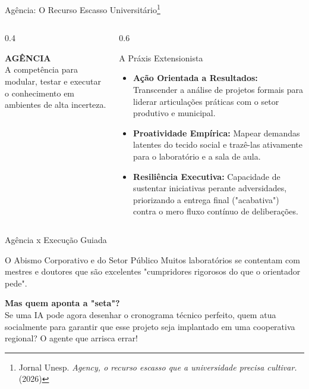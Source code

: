 \documentclass[aspectratio=169,12pt]{beamer}
\begin{document}
\begin{frame}{Agência: O Recurso Escasso Universitário\footnote{Jornal Unesp. \textit{Agency, o recurso escasso que a universidade precisa cultivar.} (2026)}}
    \begin{columns}
        \begin{column}{0.4\textwidth}
            \begin{center}
                {\Huge \textcolor{accent}{\faRunning}}
                \vspace{0.5cm}
                
                \textbf{AGÊNCIA}\\
                A competência para modular, testar e executar o conhecimento em ambientes de alta incerteza.
            \end{center}
        \end{column}
        \begin{column}{0.6\textwidth}
            \begin{block}{A Práxis Extensionista}
                \begin{itemize}
                    \item \textbf{Ação Orientada a Resultados:} Transcender a análise de projetos formais para liderar articulações práticas com o setor produtivo e municipal.
                    \item \textbf{Proatividade Empírica:} Mapear demandas latentes do tecido social e trazê-las ativamente para o laboratório e a sala de aula.
                    \item \textbf{Resiliência Executiva:} Capacidade de sustentar iniciativas perante adversidades, priorizando a entrega final ("acabativa") contra o mero fluxo contínuo de deliberações.
                \end{itemize}
            \end{block}
        \end{column}
    \end{columns}
\end{frame}

\begin{frame}{Agência x Execução Guiada}
    \begin{exampleblock}{O Abismo Corporativo e do Setor Público}
        Muitos laboratórios se contentam com mestres e doutores que são excelentes "cumpridores rigorosos do que o orientador pede".
    \end{exampleblock}

    \begin{center}
        \textbf{Mas quem aponta a "seta"?} \\
        Se uma IA pode agora desenhar o cronograma técnico perfeito, quem atua socialmente para garantir que esse projeto seja implantado em uma cooperativa regional? O agente que arrisca errar!
    \end{center}
\end{frame}
\end{document}

